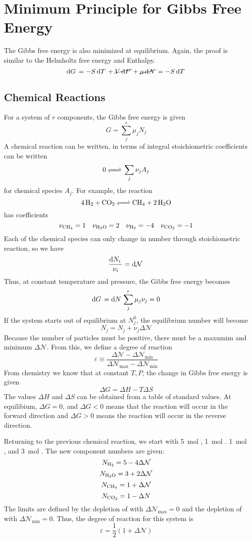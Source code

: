 \section{Minimum Principle for Gibbs Free Energy}
The Gibbs free energy is also minimized at equilibrium. Again, the proof is similar to the Helmholtz free energy and Enthalpy.
\[\d{G}=-S\d{T}+\cancel{V\d{P}}+\cancel{\mu\d{N}}=-S\d{T}\]

\subsection{Chemical Reactions}
For a system of \(r\) components, the Gibbs free energy is given
\[G = \sum_j^r\mu_jN_j\]
A chemical reaction can be written, in terms of integral stoichiometric coefficients can be written
\begin{equation}
	0\ce{<=>} \sum_j\nu_jA_j
\end{equation}
for chemical species \(A_j\). For example, the reaction
\[\ce{4H2 + CO2 <=> CH4 + 2H2O}\]
has coefficients
\[\nu_{\ce{CH4}}=1\quad\nu_{\ce{H2O}}=2 \quad \nu_{\ce{H2}}=-4 \quad \nu_{\ce{CO2}}=-1\]
Each of the chemical species can only change in number through stoichiometric reaction, so we have
\[\frac{\d{N_i}}{\nu_i}=\d{\mathcal N}\]
Thus, at constant temperature and pressure, the Gibbs free energy becomes
\[\d{G}=\d{N}\sum_j^r\mu_j\nu_j=0\]
If the system starts out of equilibrium at \(N_j^0\), the equilibrium number will become
\[N_j = N_j+\nu_j\Delta \mathcal{N}\]
Because the number of particles must be positive, there must be a maxumim and minimum \(\Delta \mathcal N\). From this, we define a degree of reaction
\begin{equation}
	\varepsilon\equiv\frac{\Delta \mathcal N-\Delta \mathcal N_{\min}}{\Delta\mathcal N_{\max}-\Delta\mathcal N_{\min}}
\end{equation}
From chemistry we know that at constant \(T,P\), the change in Gibbs free energy is given
\begin{equation}
	\Delta G = \Delta H - T \Delta S
\end{equation}
The values \(\Delta H\) and \(\Delta S\) can be obtained from a table of standard values. At equilibium, \(\Delta G=0\), and \(\Delta G<0\) means that the reaction will occur in the forward direction and \(\Delta G>0\) means the reaction will occur in the reverse direction.

Returning to the previous chemical reaction, we start with \SI{5}{mol} , \SI{1}{mol} . \SI{1}{mol} , and \SI{3}{mol} . The new component numbers are given:
\[N_{\ce{H2}} = 5-4\Delta\mathcal N\]
\[N_{\ce{H2O}}=3+2\Delta \mathcal N\]
\[N_{\ce{CH4}}=1+\Delta \mathcal N\]
\[N_{\ce{CO2}}=1-\Delta N\]
The limits are defined by the depletion of  with \(\Delta \mathcal N_{\max}=0\) and the depletion of  with \(\Delta \mathcal N_{\min}=0\). Thus, the degree of reaction for this system is
\[\varepsilon = \frac{1}{2}(1+\Delta\mathcal N)\]
